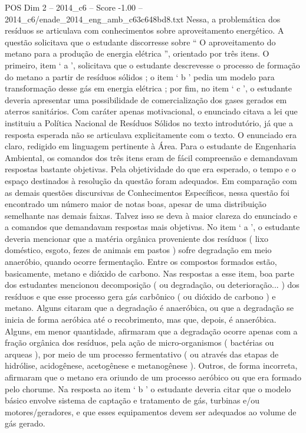 \begin{textsample}{POS Dim 2 – 2014\_c6 – Score -1.00 – 2014\_c6/enade\_2014\_eng\_amb\_c63c648bd8.txt}
Nessa, a problemática dos resíduos se articulava com conhecimentos sobre aproveitamento energético.
A questão solicitava que o estudante discorresse sobre “ O aproveitamento do metano para a produção de energia elétrica ”, orientado por três itens.
O primeiro, item ‘ a ’, solicitava que o estudante descrevesse o processo de formação do metano a partir de resíduos sólidos ; o item ‘ b ’ pedia um modelo para transformação desse gás em energia elétrica ; por fim, no item ‘ c ’, o estudante deveria apresentar uma possibilidade de comercialização dos gases gerados em aterros sanitários.
Com caráter apenas motivacional, o enunciado citava a lei que instituiu a Política Nacional de Resíduos Sólidos no texto introdutório, já que a resposta esperada não se articulava explicitamente com o texto.
O enunciado era claro, redigido em linguagem pertinente à Área.
Para o estudante de Engenharia Ambiental, os comandos dos três itens eram de fácil compreensão e demandavam respostas bastante objetivas.
Pela objetividade do que era esperado, o tempo e o espaço destinados à resolução da questão foram adequados.
Em comparação com as demais questões discursivas de Conhecimentos Específicos, nessa questão foi encontrado um número maior de notas boas, apesar de uma distribuição semelhante nas demais faixas.
Talvez isso se deva à maior clareza do enunciado e a comandos que demandavam respostas mais objetivas.
No item ‘ a ’, o estudante deveria mencionar que a matéria orgânica proveniente dos resíduos ( lixo doméstico, esgoto, fezes de animais em pastos ) sofre degradação em meio anaeróbio, quando ocorre fermentação.
Entre os compostos formados estão, basicamente, metano e dióxido de carbono.
Nas respostas a esse item, boa parte dos estudantes mencionou decomposição ( ou degradação, ou deterioração... ) dos resíduos e que esse processo gera gás carbônico ( ou dióxido de carbono ) e metano.
Alguns citaram que a degradação é anaeróbica, ou que a degradação se inicia de forma aeróbica até o recobrimento, mas que, depois, é anaeróbica.
Alguns, em menor quantidade, afirmaram que a degradação ocorre apenas com a fração orgânica dos resíduos, pela ação de micro-organismos ( bactérias ou arqueas ), por meio de um processo fermentativo ( ou através das etapas de hidrólise, acidogênese, acetogênese e metanogênese ).
Outros, de forma incorreta, afirmaram que o metano era oriundo de um processo aeróbico ou que era formado pelo chorume.
Na resposta ao item ‘ b ’ o estudante deveria citar que o modelo básico envolve sistema de captação e tratamento de gás, turbinas e/ou motores/geradores, e que esses equipamentos devem ser adequados ao volume de gás gerado.

\end{textsample}
